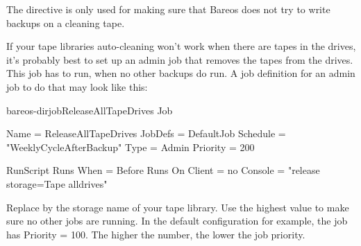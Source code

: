 The directive 
is only used for making sure that Bareos does not try to write backups on a cleaning tape.

If your tape libraries auto-cleaning won't work when there are tapes in the drives,
it's probably best to set up an admin job that removes the tapes from the drives.
This job has to run, when no other backups do run.
A job definition for an admin job to do that may look like this:

\begin{bareosConfigResource}{bareos-dir}{job}{ReleaseAllTapeDrives}
Job {
    Name = ReleaseAllTapeDrives
    JobDefs = DefaultJob
    Schedule = "WeeklyCycleAfterBackup"
    Type = Admin
    Priority = 200

    RunScript {
        Runs When = Before
        Runs On Client = no
        Console = "release storage=Tape alldrives"
    }
}
\end{bareosConfigResource}

Replace  by the storage name of your tape library.
Use the highest 
value to make sure no other jobs are running.
In the default configuration for example, the  job
has Priority = 100. The higher the number, the lower the job priority.
